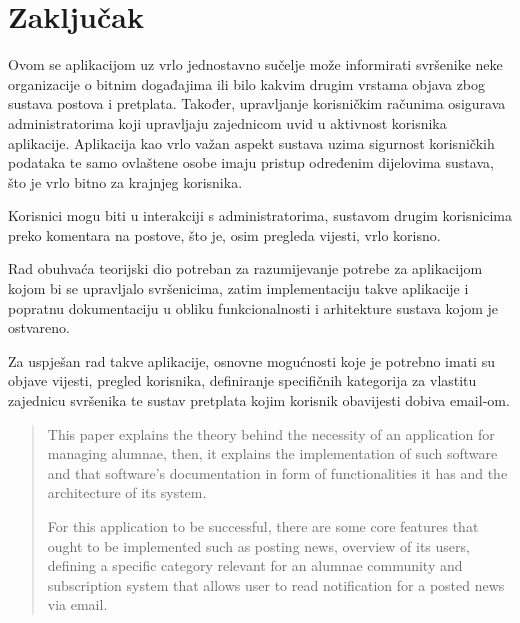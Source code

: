 \documentclass[zavrsni, numeric]{fer}
\begin{document}
\chapter{Zaključak}
Ovom se aplikacijom uz vrlo jednostavno sučelje može informirati svršenike neke organizacije o bitnim događajima ili bilo kakvim drugim vrstama objava zbog sustava postova i pretplata. Također, upravljanje korisničkim računima osigurava administratorima koji upravljaju zajednicom uvid u aktivnost korisnika aplikacije. Aplikacija kao vrlo važan aspekt sustava uzima sigurnost korisničkih podataka te samo ovlaštene osobe imaju pristup određenim dijelovima sustava, što je vrlo bitno za krajnjeg korisnika.

Korisnici mogu biti u interakciji s administratorima, sustavom drugim korisnicima preko komentara na postove, što je, osim pregleda vijesti, vrlo korisno.




\begin{sazetak}
	Rad obuhvaća teorijski dio potreban za razumijevanje potrebe za aplikacijom kojom bi se upravljalo svršenicima, zatim implementaciju takve aplikacije i popratnu dokumentaciju u obliku funkcionalnosti i arhitekture sustava kojom je ostvareno.
		
	Za uspješan rad takve aplikacije, osnovne mogućnosti koje je potrebno imati su objave vijesti, pregled korisnika, definiranje specifičnih kategorija za vlastitu zajednicu svršenika te sustav pretplata kojim korisnik obavijesti dobiva email-om.
		
\end{sazetak}

\begin{abstract}
	This paper explains the theory behind the necessity of an application for managing alumnae, then, it explains the implementation of such software and that software's documentation in form of functionalities it has and the architecture of its system.
	
	For this application to be successful, there are some core features that ought to be implemented such as posting news, overview of its users, defining a specific category relevant for an alumnae community and subscription system that allows user to read notification for a posted news via email.
				
\end{abstract}
\end{document}
